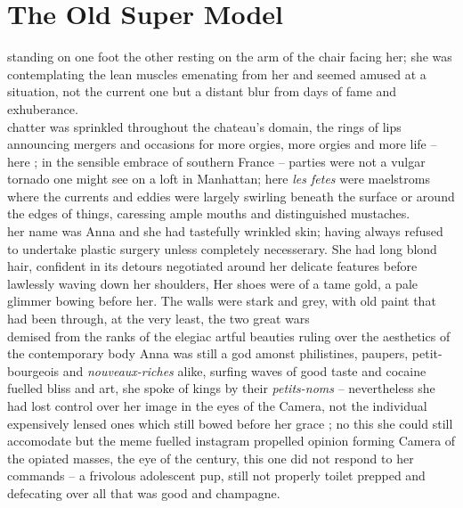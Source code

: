 

\section*{The Old Super Model}

standing on one foot the other resting on the arm of the chair facing
her; she was contemplating the lean muscles emenating from her and seemed
amused at a situation, not the current one but a distant blur from days of fame
and exhuberance.\\

chatter was sprinkled throughout the chateau's domain, 
the rings of lips announcing mergers and occasions for
more orgies, more orgies and more life --
here ; in the sensible embrace of southern France -- parties were not a vulgar
tornado one might see on a loft in Manhattan; here \textit{les fetes} were
maelstroms where the currents and eddies were largely swirling beneath the
surface or around the edges of things, caressing ample mouths and distinguished
mustaches.\\


her name was Anna  and she had tastefully wrinkled skin; having always refused
to undertake plastic surgery unless completely necesserary. She had long blond
hair, confident in its detours negotiated around her delicate features before
lawlessly waving down her shoulders,  Her shoes were of a tame
gold, a pale glimmer bowing before her. The walls were stark and grey,
with old paint that had been through, at the very least, the two great wars\\

demised from the ranks of the elegiac artful beauties ruling over the aesthetics 
of the contemporary body Anna was still a god amonst philistines, paupers,
petit-bourgeois and \textit{nouveaux-riches} alike, surfing waves of good taste
and cocaine fuelled bliss and art, she spoke of kings by their
\textit{petits-noms} -- nevertheless she had lost control over her image in the
eyes of the Camera, not the individual expensively lensed ones which still
bowed before her grace ; no this she could still accomodate but the meme fuelled
instagram propelled opinion forming Camera of the opiated masses, the eye 
of the century, this one did not respond to her commands -- a frivolous
adolescent pup, still not properly toilet prepped and defecating over all that
was good and champagne.\\
\clearpage 

